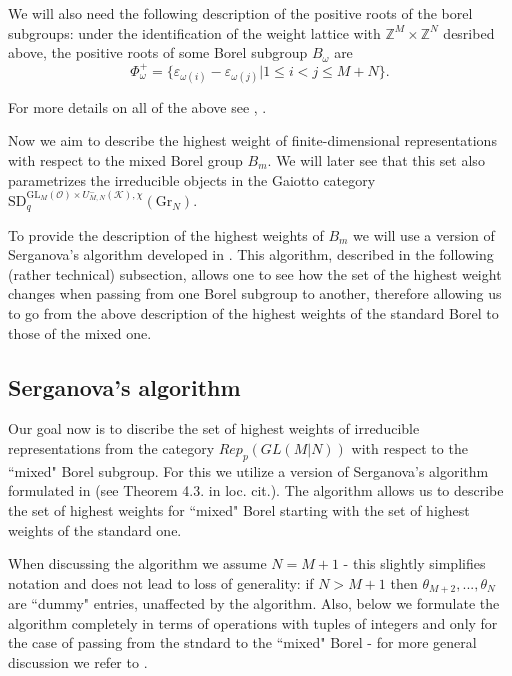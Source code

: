 \documentclass[12pt]{amsart}
\numberwithin{equation}{section}
\numberwithin{equation}{section}
\theoremstyle{definition}
\begin{document}
We will also need the following description of the positive roots of the borel subgroups: under the identification of the weight lattice with $\mathbb{Z}^M \times \mathbb{Z}^N$ desribed above, the positive roots of some Borel subgroup $B_\omega$ are
\begin{equation}
    \Phi^+_\omega = \{ \varepsilon_{\omega(i)} - \varepsilon_{\omega(j)}| 1 \le i < j \le M+N\}.
\end{equation}

For more details on all of the above see \cite{ty}, \cite{s}.

Now we aim to describe the highest weight of finite-dimensional representations with respect to the mixed Borel group $B_{m}$. We will later see that this set also parametrizes the irreducible objects in the Gaiotto category $\mathrm{SD}_q^{\mathrm{GL}_M(\mathcal{O}) \times U_{M,N}^{-}(\mathcal{K}), \chi}(\mathrm{Gr}_N)$. 

To provide the description of the highest weights of $B_{m}$ we will use a version of Serganova's algorithm developed in \cite{bk}. This algorithm, described in the following (rather technical) subsection, allows one to see how the set of the highest weight changes when passing from one Borel subgroup to another, therefore allowing us to go from the above description of the highest weights of the standard Borel to those of the mixed one.


\subsection{Serganova's algorithm}

Our goal now is to discribe the set of highest weights of irreducible representations from the category $Rep_p(GL(M|N))$ with respect to the ``mixed" Borel subgroup. For this we utilize a version of Serganova's algorithm formulated in \cite{bk} (see Theorem 4.3. in loc. cit.). The algorithm allows us to describe the set of highest weights for ``mixed" Borel starting with the set of highest weights of the standard one. 

When discussing the algorithm we assume $N=M+1$ - this slightly simplifies notation and does not lead to loss of generality: if $N>M+1$ then $\theta_{M+2},...,\theta_{N}$ are ``dummy" entries, unaffected by the algorithm. Also, below we formulate the algorithm completely in terms of operations with tuples of integers and only for the case of passing from the stndard to the ``mixed" Borel - for more general discussion we refer to \cite{bk}.
\end{document}
